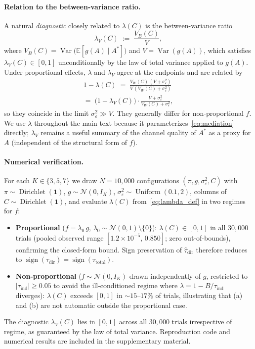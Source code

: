 \paragraph{Relation to the between-variance ratio.}
A natural \emph{diagnostic} closely related to $\lambda(C)$ is the between-variance ratio
\begin{equation}
\label{eq:vb_ratio}
  \lambda_V(C) \;:=\; \frac{V_B(C)}{V},
\end{equation}
where $V_B(C)=\operatorname{Var}\!\bigl(\mathbb{E}[g(A)\mid A^*]\bigr)$ and $V=\operatorname{Var}(g(A))$,
which satisfies $\lambda_V(C)\in[0,1]$ unconditionally by the law of total variance applied to $g(A)$. Under proportional effects, $\lambda$ and $\lambda_V$ agree at the endpoints and are related by
\begin{multline*}
  1-\lambda(C)\;=\;\frac{V_W(C)\,(V+\sigma_\varepsilon^2)}{V\,(V_W(C)+\sigma_\varepsilon^2)}\\
  =\;\bigl(1-\lambda_V(C)\bigr)\cdot\frac{V+\sigma_\varepsilon^2}{V_W(C)+\sigma_\varepsilon^2},
\end{multline*}
so they coincide in the limit $\sigma_\varepsilon^2\gg V$. They generally differ for non-proportional $f$. We use $\lambda$ throughout the main text because it parameterizes~\eqref{eq:mediation} directly; $\lambda_V$ remains a useful summary of the channel quality of $A^*$ as a proxy for $A$ (independent of the structural form of $f$).

\paragraph{Numerical verification.}
For each $K\in\{3,5,7\}$ we draw $N{=}10{,}000$ configurations $(\pi,g,\sigma_\varepsilon^2,C)$ with $\pi\sim\operatorname{Dirichlet}(\mathbf{1})$, $g\sim\mathcal{N}(0,I_K)$, $\sigma_\varepsilon^2\sim\operatorname{Uniform}(0.1,2)$, columns of $C\sim\operatorname{Dirichlet}(\mathbf{1})$, and evaluate $\lambda(C)$ from~\eqref{eq:lambda_def} in two regimes for $f$:
\begin{itemize}\itemsep0pt
\item \textbf{Proportional} ($f=\lambda_0\,g$, $\lambda_0\sim\mathcal{N}(0,1)\!\setminus\!\{0\}$): $\lambda(C)\in[0,1]$ in all $30{,}000$ trials (pooled observed range $[1.2{\times}10^{-5},\,0.850]$; zero out-of-bounds), confirming the closed-form bound. Sign preservation of $\hat\tau_{\mathrm{dir}}$ therefore reduces to $\operatorname{sign}(\tau_{\mathrm{dir}})=\operatorname{sign}(\tau_{\mathrm{total}})$.
\item \textbf{Non-proportional} ($f\sim\mathcal{N}(0,I_K)$ drawn independently of $g$, restricted to $|\tau_{\mathrm{ind}}|\geq 0.05$ to avoid the ill-conditioned regime where $\lambda{=}1{-}B/\tau_{\mathrm{ind}}$ diverges): $\lambda(C)$ exceeds $[0,1]$ in $\sim15$--$17\%$ of trials, illustrating that (a) and (b) are not automatic outside the proportional case.
\end{itemize}
The diagnostic $\lambda_V(C)$ lies in $[0,1]$ across all $30{,}000$ trials irrespective of regime, as guaranteed by the law of total variance.
Reproduction code and numerical results are included in the supplementary material.

